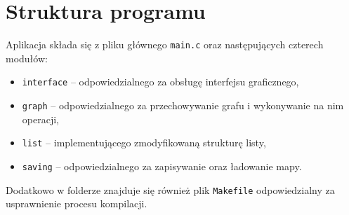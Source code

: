 \documentclass[paper=a4, fontsize=11pt]{scrartcl} %
\begin{document}
\section{Struktura programu}
Aplikacja składa się z pliku głównego \texttt{main.c} oraz następujących czterech modułów:
\begin{itemize}
    \item \texttt{interface} -- odpowiedzialnego za obsługę interfejsu graficznego,
    \item \texttt{graph} -- odpowiedzialnego za przechowywanie grafu i wykonywanie na nim operacji,
    \item \texttt{list} -- implementującego zmodyfikowaną strukturę listy,
    \item \texttt{saving} -- odpowiedzialnego za zapisywanie oraz ładowanie mapy.
\end{itemize}

\noindent Dodatkowo w folderze znajduje się również plik \texttt{Makefile} odpowiedzialny za usprawnienie procesu kompilacji.
\end{document}
